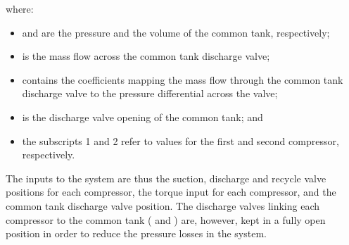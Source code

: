 \noindent where:

\begin{itemize}
  \item {} and  are the pressure and the volume of the common tank, respectively;
  \item {} is the mass flow across the common tank discharge valve;
  \item {} contains the coefficients mapping the mass flow through the common tank discharge valve to the pressure differential across the valve;
  \item {} is the discharge valve opening of the common tank; and
  \item the subscripts 1 and 2 refer to values for the first and second compressor, respectively.
\end{itemize}

The inputs to the system are thus the suction, discharge and recycle valve positions for each compressor, the torque input for each compressor, and the common tank discharge valve position.
The discharge valves linking each compressor to the common tank ( and ) are, however, kept in a fully open position in order to reduce the pressure losses in the system.

